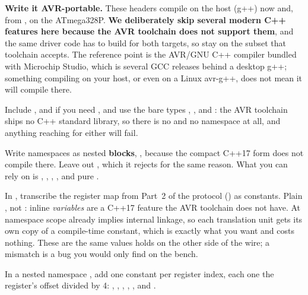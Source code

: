 \textbf{Write it AVR-portable.} These headers compile on the host (g++) now and, from ,
on the ATmega328P. \textbf{We deliberately skip several modern C++ features here because the AVR
toolchain does not support them}, and the same driver code has to build for both targets, so stay on
the subset that toolchain accepts. The reference point is the AVR/GNU C++ compiler bundled with
Microchip Studio, which is several GCC releases behind a desktop g++; something compiling on your
host, or even on a Linux avr-g++, does not mean it will compile there.

Include , and  if you need , and use the bare types
, ,  and : the AVR toolchain ships no C++
standard library, so there is no  and no  namespace at all, and anything
reaching for either will fail.

Write namespaces as nested \textbf{blocks}, ,
because the compact C++17 form  does not compile there. Leave
out \code{[[nodiscard]]}, which it rejects for the same reason. What you can rely on is
, , , , and pure .

\label{c6:set:1}

\label{c6:ex:1.1}
In , transcribe the register map from Part~2 of the
protocol () as  constants. Plain , not
: inline \emph{variables} are a C++17 feature the AVR toolchain does not
have. At namespace scope  already implies internal linkage, so each translation unit
gets its own copy of a compile-time constant, which is exactly what you want and costs nothing.
These are the same values  holds on the other side of the wire; a mismatch is a
bug you would only find on the bench.

In a nested namespace , add one  constant per register index, each one the
register's offset divided by 4: , , ,
, ,  and .


